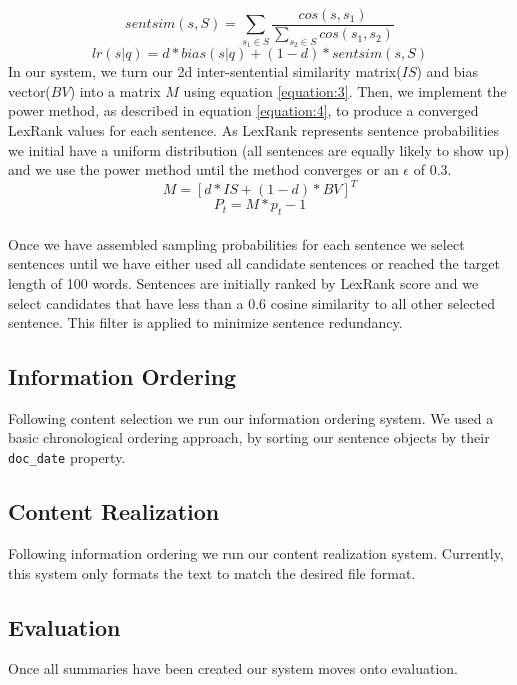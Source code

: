 \documentclass[11pt,a4paper]{article}
\begin{document}
\begin{equation}
    sentsim(s,S) = \sum_{s_1 \in S} \frac{cos(s,s_1)}{\sum_{s_2 \in S} cos(s_1,s_2) }
\end{equation}
\begin{equation}
\label{equation:2}
lr(s|q) = d * bias(s|q) + (1-d) * sentsim(s,S)
\end{equation}
In our system, we turn our 2d inter-sentential similarity matrix($IS$) and bias vector($BV$) into a matrix $M$ using equation \ref{equation:3}.  Then, we implement the power method, as described in equation \ref{equation:4}, to produce a converged LexRank values for each sentence. As LexRank represents sentence probabilities we initial have a uniform distribution (all sentences are equally likely to show up) and we use the power method until the method converges or an $\epsilon$ of 0.3.
\begin{equation}
\label{equation:3}
M = [d * IS + (1-d) * BV]^T
\end{equation}
\begin{equation}
\label{equation:4}
P_t = M * p_t-1
\end{equation} \\
Once we have assembled sampling probabilities for each sentence we select sentences until we have either used all candidate sentences or reached the target length of 100 words. Sentences are initially ranked by LexRank score and we select candidates that have less than a 0.6 cosine similarity to all other selected sentence. This filter is applied to minimize sentence redundancy. 
\subsection{Information Ordering}
Following content selection we run our information ordering system. We used a basic chronological ordering approach, by sorting our sentence objects by their \texttt{doc\_date} property.\\
\subsection{Content Realization}
Following information ordering we run our content realization system. Currently, this system only formats the text to match the desired file format.
\subsection{Evaluation}
Once all summaries have been created our system moves onto evaluation. 
\end{document}

